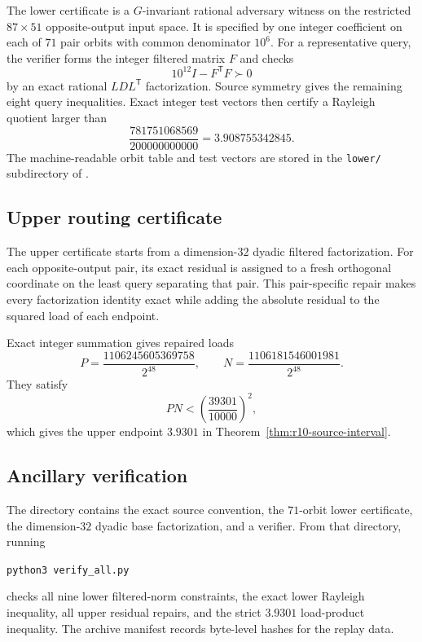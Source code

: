 \documentclass[11pt]{article}
\numberwithin{equation}{section}
\theoremstyle{remark}
\begin{document}
The lower certificate is a $G$-invariant rational adversary witness on the
restricted $87\times51$ opposite-output input space. It is specified by one
integer coefficient on each of $71$ pair orbits with common denominator
$10^6$. For a representative query, the verifier forms the integer filtered
matrix $F$ and checks
\begin{equation}
    10^{12}I-F^{\mathsf T}F\succ0
\end{equation}
by an exact rational $LDL^{\mathsf T}$ factorization. Source symmetry gives
the remaining eight query inequalities. Exact integer test vectors then
certify a Rayleigh quotient larger than
\begin{equation}
    \frac{781751068569}{200000000000}
    =3.908755342845.
\end{equation}
The machine-readable orbit table and test vectors are stored in the
\texttt{lower/} subdirectory of
.

\subsection{Upper routing certificate}
\label{app:r10-exact-routing-certificate}

The upper certificate starts from a dimension-$32$ dyadic filtered
factorization. For each opposite-output pair, its exact residual is assigned
to a fresh orthogonal coordinate on the least query separating that pair.
This pair-specific repair makes every factorization identity exact while
adding the absolute residual to the squared load of each endpoint.

Exact integer summation gives repaired loads
\begin{equation}
    P=\frac{1106245605369758}{2^{48}},
    \qquad
    N=\frac{1106181546001981}{2^{48}}.
\end{equation}
They satisfy
\begin{equation}
    PN<\left(\frac{39301}{10000}\right)^2,
\end{equation}
which gives the upper endpoint $3.9301$ in
Theorem~\ref{thm:r10-source-interval}.

\subsection{Ancillary verification}
\label{app:r10-ancillary-verification}

The directory
 contains the exact
source convention, the $71$-orbit lower certificate, the dimension-$32$
dyadic base factorization, and a verifier. From that directory, running
\begin{center}
\texttt{python3 verify\_all.py}
\end{center}
checks all nine lower filtered-norm constraints, the exact lower Rayleigh
inequality, all upper residual repairs, and the strict $3.9301$ load-product
inequality. The archive manifest records byte-level hashes for the replay
data.
\end{document}
